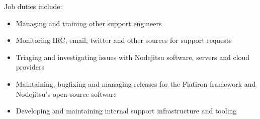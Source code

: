 \normalsize
Job duties include:
\small
\begin{itemize}
    \item Managing and training other support engineers
    \item Monitoring IRC, email, twitter and other sources for support requests
    \item Triaging and investigating issues with Nodejitsu software, servers and cloud providers
    \item Maintaining, bugfixing and managing releases for the Flatiron framework and Nodejitsu's open-source software
    \item Developing and maintaining internal support infrastructure and tooling
\end{itemize}
\normalsize
\medskip
